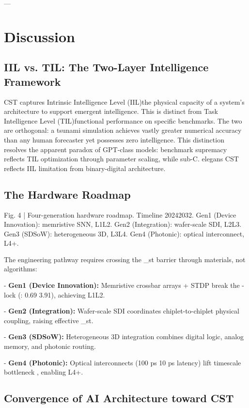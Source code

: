 \documentclass[a4paper,12pt]{article}
\begin{document}
---


\section{Discussion}

\subsection{IIL vs. TIL: The Two-Layer Intelligence Framework}

CST captures Intrinsic Intelligence Level (IIL)the physical capacity of a system's architecture to support emergent intelligence. This is distinct from Task Intelligence Level (TIL)functional performance on specific benchmarks. The two are orthogonal: a tsunami simulation achieves vastly greater numerical accuracy than any human forecaster yet possesses zero intelligence. This distinction resolves the apparent paradox of GPT-class models: benchmark supremacy reflects TIL optimization through parameter scaling, while sub-C. elegans CST reflects IIL limitation from binary-digital architecture.


\subsection{The Hardware Roadmap}




Fig. 4 | Four-generation hardware roadmap. Timeline 20242032. Gen1 (Device Innovation): memristive SNN, L1L2. Gen2 (Integration): wafer-scale SDI, L2L3. Gen3 (SDSoW): heterogeneous 3D, L3L4. Gen4 (Photonic): optical interconnect, L4+.


The engineering pathway requires crossing the _st barrier through materials, not algorithms:


- \textbf{Gen1 (Device Innovation):} Memristive crossbar arrays + STDP break the -lock (: 0.69  3.91), achieving L1L2.

- \textbf{Gen2 (Integration):} Wafer-scale SDI coordinates chiplet-to-chiplet physical coupling, raising effective _st.

- \textbf{Gen3 (SDSoW):} Heterogeneous 3D integration combines digital logic, analog memory, and photonic routing.

- \textbf{Gen4 (Photonic):} Optical interconnects (100 ps  10 ps latency) lift timescale bottleneck , enabling L4+.


\subsection{Convergence of AI Architecture toward CST}
\end{document}
